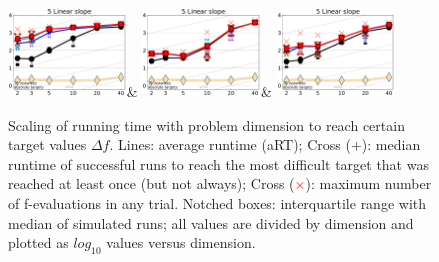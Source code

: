 \documentclass[runningheads]{llncs}
\begin{document}
{\begin{figure}[h!tb]
\begin{tabular}
    \includegraphics[width=0.28\textwidth]{GAOnly_f005}&
    \includegraphics[width=0.28\textwidth]{PSOOnly_f005}&
    \includegraphics[width=0.28\textwidth]{GAPSO_f005}\\
    \end{tabular}
    \vspace{-3ex}
     \caption{
 Scaling of running time with problem dimension to reach certain target values $\Delta f$. Lines:
 average runtime (aRT); Cross ($+$): median runtime of successful runs to reach
 the most difficult target that was reached at least once (but not always);
 Cross (\textcolor{red}{$\times$}): maximum number of f-evaluations in any trial. Notched boxes:
 interquartile range with median of simulated runs; all values are divided by
 dimension and plotted as $log_{10}$ values versus dimension. 
}
\label{fig:bbob}
\end{figure}


}
\end{document}
